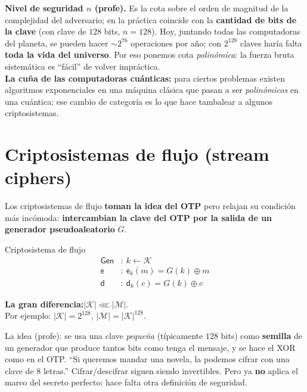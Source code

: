 \documentclass[11pt,a4paper]{article}
\newcommand{\Kset}{\mathcal{K}}
\newcommand{\Mset}{\mathcal{M}}
\newcommand{\xor}{\oplus}
\newcommand{\Gen}{\mathsf{Gen}}
\newcommand{\E}{\mathsf{e}}
\newcommand{\D}{\mathsf{d}}
\begin{document}
\begin{slidebox}
\textbf{Nivel de seguridad $n$ (profe).} Es la cota sobre el orden de magnitud de la
complejidad del adversario; en la práctica coincide con la \textbf{cantidad de bits de la
clave} (con clave de $128$ bits, $n=128$). Hoy, juntando todas las computadoras del
planeta, se pueden hacer $\sim 2^{76}$ operaciones por año; con $2^{128}$ claves haría
falta \textbf{toda la vida del universo}. Por eso ponemos cota \emph{polinómica}: la
fuerza bruta sistemática es ``fácil'' de volver impráctica.\\[3pt]
\textbf{La cuña de las computadoras cuánticas:} para ciertos problemas existen algoritmos
exponenciales en una máquina clásica que pasan a ser \emph{polinómicos} en una cuántica;
ese cambio de categoría es lo que hace tambalear a algunos criptosistemas.
\end{slidebox}

\section{Criptosistemas de flujo (stream ciphers)}

Los criptosistemas de flujo \textbf{toman la idea del OTP} pero relajan su condición más
incómoda: \textbf{intercambian la clave del OTP por la salida de un generador
pseudoaleatorio} $G$.

\begin{defbox}{Criptosistema de flujo}
\[
\begin{aligned}
  \Gen &:\ k \leftarrow \Kset\\
  \E &:\ \E_k(m) = G(k)\xor m\\
  \D &:\ \D_k(c) = G(k)\xor c
\end{aligned}
\]
\end{defbox}

\begin{notebox}
\textbf{La gran diferencia:}\quad $|\Kset| \lll |\Mset|$.\\
Por ejemplo: $|\Kset|=2^{128}$, $|\Mset| = |\Kset|^{128}$.
\end{notebox}

La idea (profe): se usa una clave \emph{pequeña} (típicamente $128$ bits) como
\textbf{semilla} de un generador que produce tantos bits como tenga el mensaje, y se hace
el XOR como en el OTP. ``Si queremos mandar una novela, la podemos cifrar con una clave de
$8$ letras.'' Cifrar/descifrar siguen siendo invertibles. Pero ya \textbf{no} aplica el
marco del secreto perfecto: hace falta otra definición de seguridad.
\end{document}
